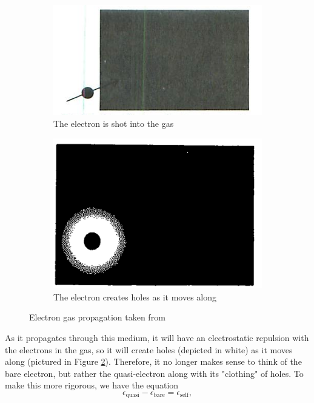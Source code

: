 \documentclass[12pt]{article}
\begin{document}
\begin{figure}
\begin{subfigure}{.5\textwidth}
  \centering
  \includegraphics[width=.8\linewidth]{shot.png}
  \caption{The electron is shot into the gas}
  \label{fig:shot}
\end{subfigure}
\begin{subfigure}{.5\textwidth}
  \centering
  \includegraphics[width=.8\linewidth]{clothing.png}
  \caption{The electron creates holes as it moves along}
  \label{fig:clothing}
\end{subfigure}
\caption{Electron gas propagation taken from}
\label{fig:propagates}
\end{figure}
As it propagates through this medium, it will have an electrostatic repulsion with the electrons in the gas, so it will create holes (depicted in white) as it moves along (pictured in Figure \ref{fig:clothing}). Therefore, it no longer makes sense to think of the bare electron, but rather the quasi-electron along with its "clothing" of holes. To make this more rigorous, we have the equation
\begin{equation}
    \epsilon_{\text{quasi}} - \epsilon_{\text{bare}} = \epsilon_{\text{self}},
\end{equation}
\end{document}
